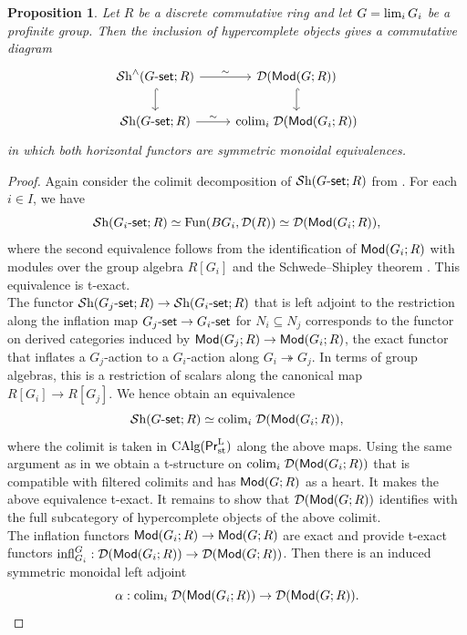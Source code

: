 \documentclass[reqno]{amsart}
\numberwithin{equation}{section}\theoremstyle{thms}
\newtheorem{prop}[equation]{Proposition}
\theoremstyle{defn}
\newcommand{\cD}{\mathcal{D}}
\newcommand{\tn}[1]{\textnormal{#1}}
\newcommand{\tsf}[1]{\textsf{\textup{#1}}}
\newcommand{\mcal}[1]{\mathcal{#1}}
\newcommand{\fun}{\tn{Fun}}
\newcommand{\sheaves}{\mcal{S}\tn{h}}
\newcommand{\calg}{\tn{CAlg}}
\newcommand{\modgr}{\tsf{Mod}(G;R)}
\newcommand{\Mod}{\tsf{Mod}}
\newcommand{\prlst}{\tsf{Pr}^{\tn{L}}_{\tn{st}}}
\newcommand{\gset}{G\tsf{-set}}
\begin{document}
\begin{prop}\label{prop:sheavesgrmodules}
Let $R$ be a discrete commutative ring and let $G= \tn{lim}_i \, G_i$ be a profinite group. Then the inclusion of hypercomplete objects gives a commutative diagram
\[\begin{tikzcd}
	{\sheaves^{\wedge}(\gset;R)} & {\cD(\modgr)} \\
	{\sheaves(\gset;R)} & {\tn{colim}_i \; \cD(\Mod(G_i;R))}
	\arrow["\sim", from=1-1, to=1-2]
	\arrow[hook, from=1-1, to=2-1]
	\arrow[hook, from=1-2, to=2-2]
	\arrow["\sim", from=2-1, to=2-2]
\end{tikzcd}\]
in which both horizontal functors are symmetric monoidal equivalences.
\end{prop}
\begin{proof}
Again consider the colimit decomposition of $\sheaves(\gset;R)$ from \cite[Construction 4.5]{cm21}. For each $i \in I$, we have 
$$\sheaves(G_i\tsf{-set};R) \simeq \fun(BG_i,\cD(R)) \simeq \cD(\Mod(G_i;R)),$$
where the second equivalence follows from the identification of $\Mod(G_i;R)$ with modules over the group algebra $R[G_i]$ and the Schwede--Shipley theorem \cite[Theorem 7.1.2.1]{lur17}. This equivalence is t-exact. \\
The functor $\sheaves(G_j\tsf{-set};R) \to \sheaves(G_i\tsf{-set};R)$ that is left adjoint to the restriction along the inflation map $G_j\tsf{-set} \to G_i\tsf{-set}$ for $N_i \subseteq N_j$ corresponds to the functor on derived categories induced by $\Mod(G_j;R) \to \Mod(G_i;R)$, the exact functor that inflates a $G_j$-action to a $G_i$-action along $G_i \twoheadrightarrow G_j$. In terms of group algebras, this is a restriction of scalars along the canonical map $R[G_i] \to R[G_j]$. We hence obtain an equivalence 
$$\sheaves(G\tsf{-set};R) \simeq \tn{colim}_i \; \cD(\Mod(G_i;R)),$$
where the colimit is taken in $\calg(\prlst)$ along the above maps. Using the same argument as in  we obtain a t-structure on $\tn{colim}_i \; \cD(\Mod(G_i;R))$ that is compatible with filtered colimits and has $\modgr$ as a heart. It makes the above equivalence t-exact. It remains to show that $\cD(\modgr)$ identifies with the full subcategory of hypercomplete objects of the above colimit. \\
The inflation functors $\Mod(G_i;R) \to \modgr$ are exact and provide t-exact functors $\tn{infl}^G_{G_i}: \cD(\Mod(G_i;R)) \to \cD(\Mod(G;R))$. Then there is an induced symmetric monoidal left adjoint 
$$\alpha: \tn{colim}_i \; \cD(\Mod(G_i;R)) \to \cD(\modgr).$$

\end{proof}
\end{document}
